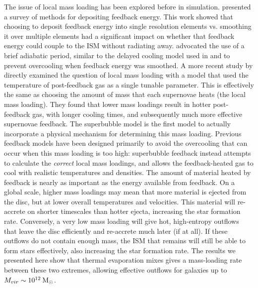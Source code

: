 The issue of local mass loading has been explored before in simulation.
\citet{Thacker2000} presented a survey of methods for depositing feedback
energy.  This work showed that choosing to deposit feedback energy into single
resolution elements vs. smoothing it over multiple elements had a significant
impact on whether that feedback energy could couple to the ISM without radiating
away.  \citet{Thacker2000} advocated the use of a brief adiabatic period,
similar to the delayed cooling model used in \citet{Stinson2006} and
\citet{Rosdahl2016} to prevent overcooling when feedback energy was smoothed.  A
more recent study by \citet{DallaVecchia2012} directly examined the question of
local mass loading with a model that used the temperature of post-feedback
gas as a single tunable parameter.  This is effectively the same as choosing
the amount of mass that each supernovae heats (the local mass loading).
They found that lower mass loadings result in hotter post-feedback gas, with
longer cooling times, and subsequently much more effective supernovae feedback.
The \citet{Keller2014} superbubble model is the first model to actually
incorporate a physical mechanism for determining this mass loading.  Previous
feedback models have been designed primarily to avoid the overcooling that can
occur when this mass loading is too high: superbubble feedback instead attempts
to calculate the {\it correct} local mass loadings, and allows the
feedback-heated gas to cool with realistic temperatures and densities.  The
amount of material heated by feedback is nearly as important as the energy
available from feedback.  On a global scale, higher mass loadings may mean that
more material is ejected from the disc, but at lower overall temperatures and
velocities.  This material will re-accrete on shorter timescales than hotter
ejecta, increasing the star formation rate.  Conversely, a very low mass loading
will give hot, high-entropy outflows that leave the disc efficiently and
re-accrete much later (if at all).  If these outflows do not contain enough
mass, the ISM that remains will still be able to form stars effectively, also
increasing the star formation rate.  The results we presented here show that
thermal evaporation mixes gives a mass-loading rate between these two extremes,
allowing effective outflows for galaxies up to $M_{vir}\sim10^{12}\>{\rm M_{\odot}}$.

